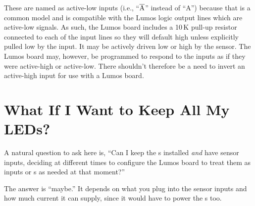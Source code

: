 \documentclass[letterpaper,twoside,onecolumn,openright,final]{memoir}
\begin{document}
These are named as active-low inputs (i.e., ``$\overline{\hbox{A}}$'' instead of ``A'') because that
is a common model and is compatible with the Lumos logic output lines which are active-low signals.
As such, the Lumos board includes a 10\,K pull-up resistor connected to each of the input lines
so they will default high unless explicitly pulled low by the input.  It may be actively driven low
or high by the sensor.  The Lumos board may, however, be programmed to respond to the inputs as if
they were active-high or active-low.  There shouldn't therefore be a need to invert an active-high
input for use with a Lumos board.

\section{What If I Want to Keep All My LEDs?}
A natural question to ask here is, ``Can I keep the s installed \emph{and} 
have sensor inputs, deciding at different times to configure the Lumos board to treat them
as inputs or s as needed at that moment?''

The answer is ``maybe.''  It depends on what you plug into the sensor inputs and how much
current it can supply, since it would have to power the s too.  
\end{document}

